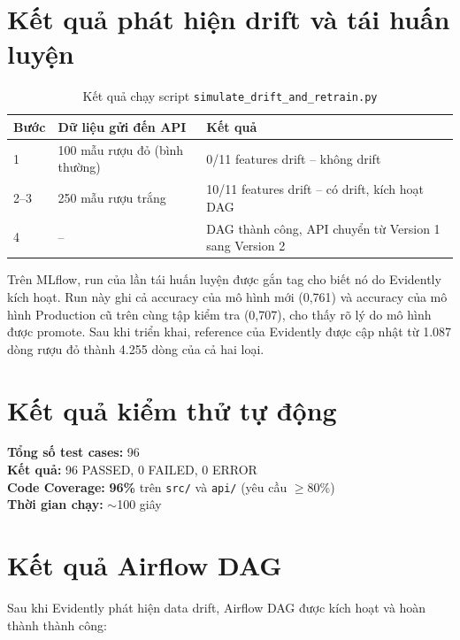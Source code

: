 \documentclass[12pt,a4paper]{report}
\begin{document}
\section{Kết quả phát hiện drift và tái huấn luyện}

\begin{table}[H]
  \centering
  \caption{Kết quả chạy script \texttt{simulate\_drift\_and\_retrain.py}}
  \label{tab:drift-result}
  \begin{tabularx}{\textwidth}{lXX}
    \toprule
    \textbf{Bước} & \textbf{Dữ liệu gửi đến API} & \textbf{Kết quả} \\
    \midrule
    1 & 100 mẫu rượu đỏ (bình thường)  & 0/11 features drift -- không drift \\
    2--3 & 250 mẫu rượu trắng          & 10/11 features drift -- có drift, kích hoạt DAG \\
    4 & --                             & DAG thành công, API chuyển từ Version 1 sang Version 2 \\
    \bottomrule
  \end{tabularx}
\end{table}

Trên MLflow, run của lần tái huấn luyện được gắn tag cho biết nó do Evidently kích hoạt. Run này ghi cả accuracy của mô hình mới (0,761) và accuracy của mô hình Production cũ trên cùng tập kiểm tra (0,707), cho thấy rõ lý do mô hình được promote. Sau khi triển khai, reference của Evidently được cập nhật từ 1.087 dòng rượu đỏ thành 4.255 dòng của cả hai loại.

\section{Kết quả kiểm thử tự động}

\begin{resultbox}
\textbf{Tổng số test cases:} 96\\
\textbf{Kết quả:} 96 PASSED, 0 FAILED, 0 ERROR\\
\textbf{Code Coverage:} \textbf{96\%} trên \texttt{src/} và \texttt{api/} (yêu cầu $\geq$80\%)\\
\textbf{Thời gian chạy:} $\sim$100 giây
\end{resultbox}

\section{Kết quả Airflow DAG}

Sau khi Evidently phát hiện data drift, Airflow DAG được kích hoạt và hoàn thành thành công:
\end{document}
